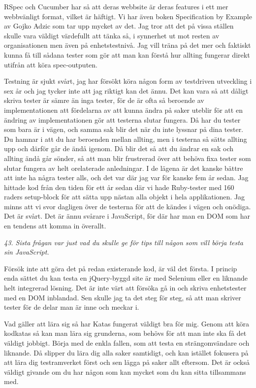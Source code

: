 \documentclass[11pt]{article}
\begin{document}
RSpec och Cucumber har så att deras webbsite är deras features i ett mer webbvänligt format, vilket är häftigt. Vi har även boken Specification by Example av Gojko Adzic som tar upp mycket av det. Jag tror att det på vissa ställen skulle vara väldigt värdefullt att tänka så, i synnerhet ut mot resten av organisationen men även på enhetstestnivå. Jag vill träna på det mer och faktiskt kunna få till sådana tester som gör att man kan förstå hur allting fungerar direkt utifrån att köra spec-outputen.

Testning är sjukt svårt, jag har försökt köra någon form av testdriven utveckling i sex år och jag tycker inte att jag riktigt kan det ännu. Det kan vara så att dåligt skriva tester är sämre än inga tester, för de är ofta så beroende av implementationen att fördelarna av att kunna ändra på saker uteblir för att en ändring av implementationen gör att testerna slutar fungera. Då har du tester som bara är i vägen, och samma sak blir det när du inte lyssnar på dina tester. Du hamnar i att du har beroenden mellan allting, men i testerna så sätts allting upp och därför går de ändå igenom. Då blir det så att du ändrar en sak och allting ändå går sönder, så att man blir frustrerad över att behöva fixa tester som slutar fungera av helt orelaterade anledningar. I de lägena är det kanske bättre att inte ha några tester alls, och det var där jag var för kanske fem år sedan. Jag hittade kod från den tiden för ett år sedan där vi hade Ruby-tester med 160 raders setup-block för att sätta upp nästan alla objekt i hela applikationen. Jag minns att vi svor dagligen över de testerna för att de kändes i vägen och onödiga. Det är svårt. Det är ännu svårare i JavaScript, för där har man en DOM som har en tendens att komma in överallt.

\emph{43. Sista frågan var just vad du skulle ge för tips till någon som vill börja testa sin JavaScript.}

Försök inte att göra det på redan existerande kod, är väl det första. I princip enda sättet du kan testa en jQuery-byggd site är med Selenium eller en liknande helt integrerad lösning. Det är inte värt att försöka gå in och skriva enhetstester med en DOM inblandad. Sen skulle jag ta det steg för steg, så att man skriver tester för de delar man är inne och meckar i.

Vad gäller att lära sig så har Katas fungerat väldigt bra för mig. Genom att köra kodkatas så kan man lära sig grunderna, som behövs för att man inte ska få det väldigt jobbigt. Börja med de enkla fallen, som att testa en strängomvändare och liknande. Då slipper du lära dig alla saker samtidigt, och kan istället fokusera på att lära dig testramverket först och sen lägga på saker allt eftersom. Det är också väldigt givande om du har någon som kan mycket som du kan sitta tillsammans med.
\end{document}
